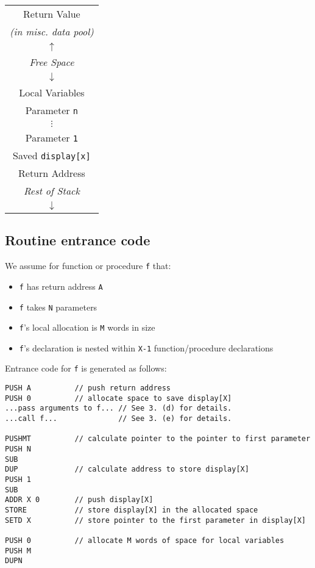\documentclass[11pt]{article}
\begin{document}
    \begin{tabular}{|c|}
    \hline
    Return Value \\
    \textit{(in misc. data pool)}\\
    \hline
    \cellcolor{gray!15}
    $\uparrow$\\
    \cellcolor{gray!15}
    \textit{Free Space} \\
    \cellcolor{gray!15}
    $\downarrow$\\
    \hline
    Local Variables \\
    \hline
    Parameter \texttt{n}\\
    $\vdots$\\
    Parameter \texttt{1}\\
    \hline
    Saved \texttt{display[x]} \\
    \hline
    Return Address\\
    \hline
    \cellcolor{gray!15}
    \textit{Rest of Stack} \\
    \cellcolor{gray!15}
    $\downarrow$\\
    \hline
    \end{tabular}

\subsection{Routine entrance code}

We assume for function or procedure \texttt{f} that:
    \begin{itemize}
    \item \texttt{f} has return address \texttt{A}
    \item \texttt{f} takes \texttt{N} parameters
    \item \texttt{f}'s local allocation is \texttt{M} words in size
    \item  \texttt{f}'s declaration is nested within \texttt{X-1} function/procedure declarations
    \end{itemize}

Entrance code for \texttt{f} is generated as follows:

\begin{verbatim}
PUSH A          // push return address
PUSH 0          // allocate space to save display[X]
...pass arguments to f... // See 3. (d) for details.
...call f...              // See 3. (e) for details.

PUSHMT          // calculate pointer to the pointer to first parameter
PUSH N
SUB
DUP             // calculate address to store display[X]
PUSH 1
SUB
ADDR X 0        // push display[X]
STORE           // store display[X] in the allocated space
SETD X          // store pointer to the first parameter in display[X]

PUSH 0          // allocate M words of space for local variables
PUSH M
DUPN
\end{verbatim}
\end{document}

